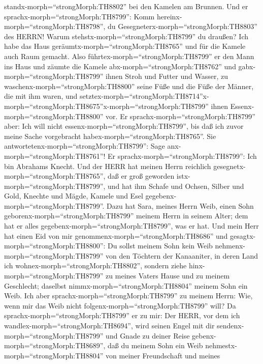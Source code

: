 standx-morph=``strongMorph:TH8802'' bei den Kamelen am Brunnen.
 Und er sprachx-morph=``strongMorph:TH8799'': Komm
hereinx-morph=``strongMorph:TH8798'', du
Gesegneterx-morph=``strongMorph:TH8803'' des HERRN! Warum
stehstx-morph=``strongMorph:TH8799'' du draußen? Ich habe das Haus
geräumtx-morph=``strongMorph:TH8765'' und für die Kamele auch Raum
gemacht.  Also führtex-morph=``strongMorph:TH8799'' er den
Mann ins Haus und zäumte die Kamele abx-morph=``strongMorph:TH8762'' und
gabx-morph=``strongMorph:TH8799'' ihnen Stroh und Futter und Wasser, zu
waschenx-morph=``strongMorph:TH8800'' seine Füße und die Füße der
Männer, die mit ihm waren,  und
setztex-morph=``strongMorph:TH8714''\textbar x-morph=``strongMorph:TH8675''x-morph=``strongMorph:TH8799''
ihnen Essenx-morph=``strongMorph:TH8800'' vor. Er
sprachx-morph=``strongMorph:TH8799'' aber: Ich will nicht
essenx-morph=``strongMorph:TH8799'', bis daß ich zuvor meine Sache
vorgebracht habex-morph=``strongMorph:TH8765''. Sie
antwortetenx-morph=``strongMorph:TH8799'': Sage
anx-morph=``strongMorph:TH8761''!  Er
sprachx-morph=``strongMorph:TH8799'': Ich bin Abrahams Knecht.
 Und der HERR hat meinen Herrn reichlich
gesegnetx-morph=``strongMorph:TH8765'', daß er groß geworden
istx-morph=``strongMorph:TH8799'', und hat ihm Schafe und Ochsen, Silber
und Gold, Knechte und Mägde, Kamele und Esel
gegebenx-morph=``strongMorph:TH8799''.  Dazu hat Sara,
meines Herrn Weib, einen Sohn geborenx-morph=``strongMorph:TH8799''
meinem Herrn in seinem Alter; dem hat er alles
gegebenx-morph=``strongMorph:TH8799'', was er hat.  Und
mein Herr hat einen Eid von mir genommenx-morph=``strongMorph:TH8686''
und gesagtx-morph=``strongMorph:TH8800'': Du sollst meinem Sohn kein
Weib nehmenx-morph=``strongMorph:TH8799'' von den Töchtern der
Kanaaniter, in deren Land ich wohnex-morph=``strongMorph:TH8802'',
 sondern ziehe hinx-morph=``strongMorph:TH8799'' zu meines
Vaters Hause und zu meinem Geschlecht; daselbst
nimmx-morph=``strongMorph:TH8804'' meinem Sohn ein Weib. 
Ich aber sprachx-morph=``strongMorph:TH8799'' zu meinem Herrn: Wie, wenn
mir das Weib nicht folgenx-morph=``strongMorph:TH8799'' will?
 Da sprachx-morph=``strongMorph:TH8799'' er zu mir: Der
HERR, vor dem ich wandlex-morph=``strongMorph:TH8694'', wird seinen
Engel mit dir sendenx-morph=``strongMorph:TH8799'' und Gnade zu deiner
Reise gebenx-morph=``strongMorph:TH8689'', daß du meinem Sohn ein Weib
nehmestx-morph=``strongMorph:TH8804'' von meiner Freundschaft und meines
